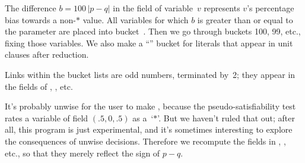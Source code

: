 The difference $b=100\,\vert p-q\vert$ in the field of variable~$v$
represents $v$'s percentage bias
towards a non-$*$ value. All variables for which $b$ is greater than
or equal to the  parameter are placed into bucket~.
Then we go through buckets 100, 99, etc., fixing those variables.
We also make a ``'' bucket for literals that appear in unit
clauses after reduction.

Links within the bucket lists are odd numbers, terminated by~2; they
appear in the  fields of , , etc.

It's probably unwise for the user to make , because
the pseudo-satisfiability test rates a variable of field $(.5,0,.5)$
as a~`$*$'. But we haven't ruled that out; after all, this program
is just experimental, and it's sometimes interesting to explore the
consequences of unwise decisions. Therefore we recompute the
 fields in , , etc., so
that they
merely reflect the sign of $p-q$.

